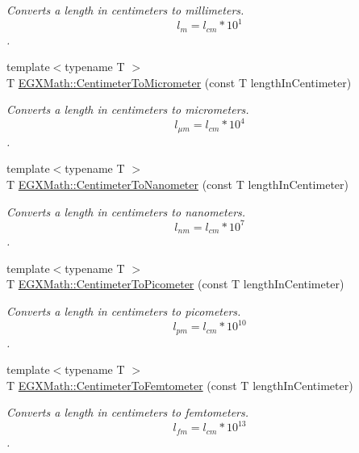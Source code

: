 \begin{DoxyCompactItemize}
\begin{DoxyCompactList}\small\item\em Converts a length in centimeters to millimeters. \[ l_{m}=l_{cm} * 10^{1} \]. \end{DoxyCompactList}\item 
{\footnotesize template$<$typename T $>$ }\\T \mbox{\hyperlink{group___e_g_x_math-_conversions-_length_conversions-_centimeter-_s_i_gaa05fd2c1b2c9ab2ac8aa7f1ef8be612a}{E\+G\+X\+Math\+::\+Centimeter\+To\+Micrometer}} (const T length\+In\+Centimeter)
\begin{DoxyCompactList}\small\item\em Converts a length in centimeters to micrometers. \[ l_{\mu m}=l_{cm} * 10^{4} \]. \end{DoxyCompactList}\item 
{\footnotesize template$<$typename T $>$ }\\T \mbox{\hyperlink{group___e_g_x_math-_conversions-_length_conversions-_centimeter-_s_i_gacf80778df778af3266027dbe32bfd2d4}{E\+G\+X\+Math\+::\+Centimeter\+To\+Nanometer}} (const T length\+In\+Centimeter)
\begin{DoxyCompactList}\small\item\em Converts a length in centimeters to nanometers. \[ l_{nm}=l_{cm} * 10^{7} \]. \end{DoxyCompactList}\item 
{\footnotesize template$<$typename T $>$ }\\T \mbox{\hyperlink{group___e_g_x_math-_conversions-_length_conversions-_centimeter-_s_i_ga7e2851b0052f1b135a84aa860495e4ba}{E\+G\+X\+Math\+::\+Centimeter\+To\+Picometer}} (const T length\+In\+Centimeter)
\begin{DoxyCompactList}\small\item\em Converts a length in centimeters to picometers. \[ l_{pm}=l_{cm} * 10^{10} \]. \end{DoxyCompactList}\item 
{\footnotesize template$<$typename T $>$ }\\T \mbox{\hyperlink{group___e_g_x_math-_conversions-_length_conversions-_centimeter-_s_i_ga1d86301dcf9e8d9d75127c3d998f9c0b}{E\+G\+X\+Math\+::\+Centimeter\+To\+Femtometer}} (const T length\+In\+Centimeter)
\begin{DoxyCompactList}\small\item\em Converts a length in centimeters to femtometers. \[ l_{fm}=l_{cm} * 10^{13} \]. \end{DoxyCompactList}\item 

\end{DoxyCompactItemize}

